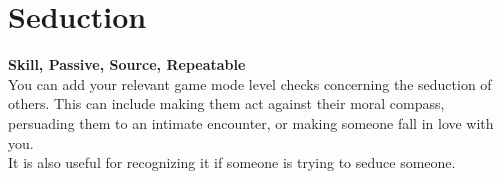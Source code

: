 \section{Seduction}\label{sec:seduction}
\textbf{Skill, Passive, Source, Repeatable}\\
You can add your relevant game mode level checks concerning the seduction of others.
This can include making them act against their moral compass, persuading them to an intimate encounter, or making someone fall in love with you.\\
It is also useful for recognizing it if someone is trying to seduce someone.